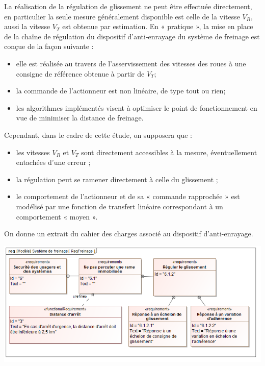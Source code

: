 \documentclass[11pt,oneside]{article}
\begin{document}
{La réalisation de la régulation de glissement ne peut être effectuée directement, en particulier la seule mesure généralement disponible est celle de la vitesse $V_R$, aussi la vitesse $V_T$ est obtenue par estimation. En « pratique », la mise en place de la chaîne de régulation du dispositif d'anti-enrayage du système de freinage est conçue de la façon suivante :
\begin{itemize}
\item elle est réalisée au travers de l'asservissement des vitesses des roues à une consigne de référence obtenue à partir de $V_T$;
\item la commande de l'actionneur est non linéaire, de type tout ou rien;
\item les algorithmes implémentés visent à optimiser le point de fonctionnement
en vue de minimiser la distance de freinage.
\end{itemize}
Cependant, dans le cadre de cette étude, on supposera que :
\begin{itemize}
\item les vitesses $V_R$ et $V_T$ sont directement accessibles à la mesure, éventuellement
entachées d’une erreur ;
\item la régulation peut se ramener directement à celle du glissement ;
\item le comportement de l’actionneur et de sa « commande rapprochée » est modélisé
par une fonction de transfert linéaire correspondant à un comportement
« moyen ».
\end{itemize}
On donne un extrait du cahier des charges associé au dispositif d'anti-enrayage.
\begin{center}
\includegraphics[width=.95\linewidth]{png/ReqFreinage}
\end{center}
}
\end{document}
